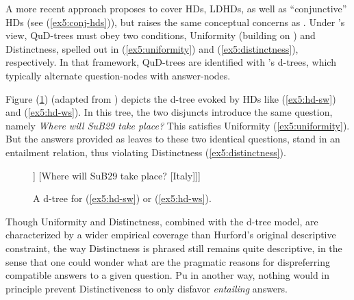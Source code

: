 A more recent approach \citep{Zhang2022} proposes to cover HDs, LDHDs, as well as ``conjunctive'' HDs (see (\ref{ex5:conj-hds})), but raises the same conceptual concerns as \citet{Ippolito2019}. Under \citeauthor{Zhang2022}'s view, QuD-trees must obey two conditions, Uniformity (building on ) and Distinctness, spelled out in (\ref{ex5:uniformity}) and (\ref{ex5:distinctness}), respectively. In that framework, QuD-trees are identified with \citeauthor{Buring2003}'s d-trees, which typically alternate question-nodes with answer-nodes.

\begin{exe}
	\label{ex5:uniformity}
	\label{ex5:distinctness}
\end{exe}


Figure (\ref{fig5:dtree-noto-or-italy}) (adapted from ) depicts the d-tree evoked by HDs like (\ref{ex5:hd-sw}) and (\ref{ex5:hd-ws}). In this tree, the two disjuncts introduce the same question, namely \textit{Where will SuB29 take place?} This satisfies Uniformity (\ref{ex5:uniformity}). But the answers provided as leaves to these two identical questions, stand in an entailment relation, thus violating Distinctness (\ref{ex5:distinctness}).

\begin{figure}[H]
	\centering
	\begin{forest}
		[{Where will SuB29 take place?} [{Where will SuB29 take place?} [Noto]] [{Where will SuB29 take place?} [Italy]]]
	\end{forest}
	\caption[]{A d-tree for (\ref{ex5:hd-sw}) or (\ref{ex5:hd-ws}).}\label{fig5:dtree-noto-or-italy}
\end{figure}

Though Uniformity and Distinctness, combined with the d-tree model, are characterized by a wider empirical coverage than Hurford's original descriptive constraint, the way Distinctness is phrased still remains quite descriptive, in the sense that one could wonder what are the pragmatic reasons for dispreferring compatible answers to a given question. Pu in another way, nothing would in principle prevent Distinctiveness to only disfavor \textit{entailing} answers.\\

